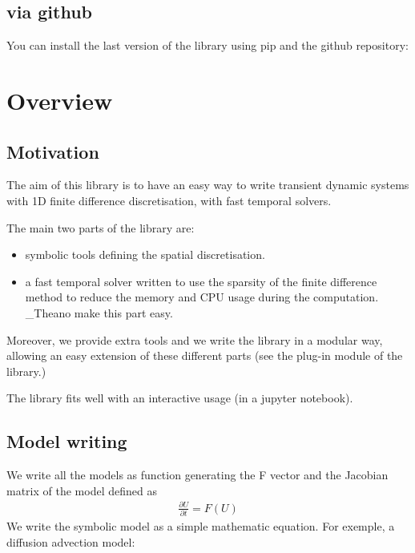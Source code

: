 \documentclass[letterpaper,10pt,english]{sphinxmanual}
\begin{document}
\section{via github}
\label{\detokenize{installation:via-github}}
You can install the last version of the library using pip and the github repository:

\begin{sphinxVerbatim}[commandchars=\\\{\}]
  
\end{sphinxVerbatim}


\chapter{Overview}
\label{\detokenize{overview:overview}}\label{\detokenize{overview::doc}}

\section{Motivation}
\label{\detokenize{overview:motivation}}
The aim of this library is to have an easy way to write transient dynamic systems with 1D finite difference discretisation, with fast temporal solvers.

The main two parts of the library are:
\begin{itemize}
\item {} 
symbolic tools defining the spatial discretisation.

\item {} 
a fast temporal solver written to use the sparsity of the finite difference method to reduce the memory and CPU usage during the computation. \_Theano make this part easy.

\end{itemize}

Moreover, we provide extra tools and we write the library in a modular way, allowing an easy extension of these different parts (see the plug-in module of the library.)

The library fits well with an interactive usage (in a jupyter notebook).


\section{Model writing}
\label{\detokenize{overview:model-writing}}
We write all the models as function generating the F vector and the Jacobian matrix of the model defined as
\begin{equation*}
\begin{split}\frac{\partial U}{\partial t} = F(U)\end{split}
\end{equation*}
We write the symbolic model as a simple mathematic equation. For exemple, a diffusion advection model:
\end{document}
